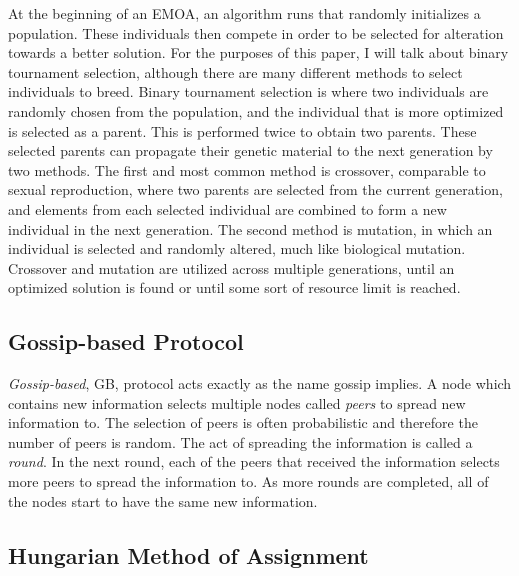 \documentclass{sig-alternate}
\begin{document}
At the beginning of an EMOA, an algorithm runs that randomly initializes a population. These individuals then compete in order to be selected for alteration towards a better solution. For the purposes of this paper, I will talk about binary tournament selection, although there are many different methods to select individuals to breed. Binary tournament selection is where two individuals are randomly chosen from the population, and the individual that is more optimized is selected as a parent. This is performed twice to obtain two parents.  These selected parents can propagate their genetic material to the next generation by two methods. The first and most common method is crossover, comparable to sexual reproduction, where two parents are selected from the current generation, and elements from each selected individual are combined to form a new individual in the next generation. The second method is mutation, in which an individual is selected and randomly altered, much like biological mutation. Crossover and mutation are utilized across multiple generations, until an optimized solution is found or until some sort of resource limit is reached.

\subsection{Gossip-based Protocol}
\label{sec:GBP}

\emph{Gossip-based}, GB, protocol acts exactly as the name gossip implies. A node which contains new information selects multiple nodes called \emph{peers} to spread new information to. The selection of peers is often probabilistic and therefore the number of peers is random. The act of spreading the information is called a \emph{round}. In the next round, each of the peers that received the information selects more peers to spread the information to. As more rounds are completed, all of the nodes start to have the same new information.~\cite{Yanggratoke}

\subsection{Hungarian Method of Assignment}
\label{sec:HMA}
\end{document}
